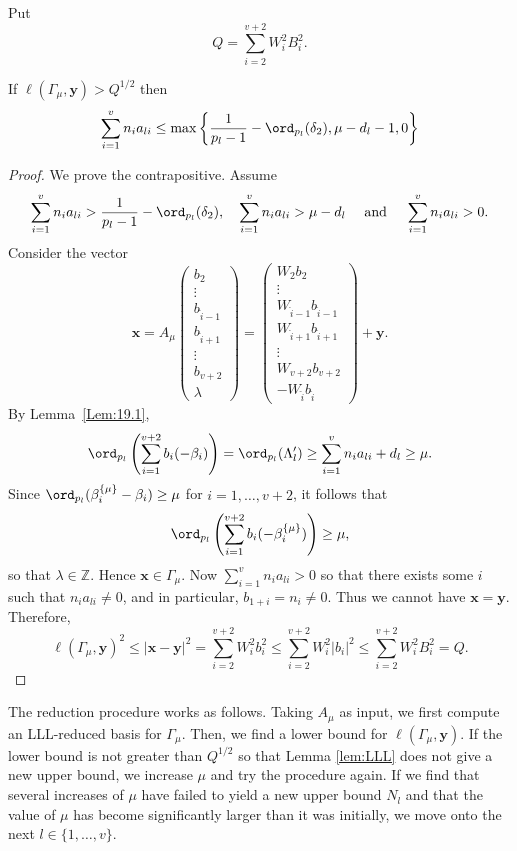 {Put
\[Q = \sum_{i = 2}^{v+2} W_i^2 B_i^2.\]

\begin{lemma} \label{lem:LLL}
If $\ell(\Gamma_{\mu},\mathbf{y}) > Q^{1/2}$ then
\[\sum_{i = 1}^v n_{i}a_{li} \leq \max\left\{ \frac{1}{p_l-1} - \ord_{p_l}(\delta_2), \mu - d_l - 1,0\right\}\]
\end{lemma}

\begin{proof}
We prove the contrapositive. Assume 
\[\sum_{i = 1}^v n_{i}a_{li} > \frac{1}{p_l-1} - \ord_{p_l}(\delta_2), \quad \sum_{i = 1}^v n_{i}a_{li} > \mu - d_l 
\quad \text{ and } \quad \sum_{i = 1}^v n_{i}a_{li} > 0.\]
Consider the vector
\[\mathbf{x} = A_{\mu}
\begin{pmatrix}
b_2\\
\vdots\\
b_{\hat{i}-1}\\
b_{\hat{i}+1}\\
\vdots\\
b_{v+2}\\
\lambda
\end{pmatrix}
= 
\begin{pmatrix}
W_2b_2\\
\vdots\\
W_{\hat{i}-1}b_{\hat{i}-1}\\
W_{\hat{i}+1}b_{\hat{i}+1}\\
\vdots\\
W_{v+2}b_{v+2}\\
-W_{\hat{i}}b_{\hat{i}}
\end{pmatrix}
+ \mathbf{y}.\]
By Lemma~\ref{Lem:19.1},  
\[\ord_{p_l}\left( \sum_{i=1}^{v+2}b_i(-\beta_i)\right) = \ord_{p_l}(\Lambda_l') \geq\sum_{i = 1}^v n_{i}a_{li} + d_l \geq \mu.\]
Since $\ord_{p_l}(\beta_i^{\{\mu\}} - \beta_i) \geq \mu$ for $i = 1, \dots, v+2$, it follows that
\[\ord_{p_l}\left( \sum_{i=1}^{v+2}b_i(-\beta_i^{\{\mu\}})\right) \geq \mu,\]
so that $\lambda \in \mathbb{Z}$. Hence $\mathbf{x} \in \Gamma_{\mu}$. Now $\sum_{i = 1}^v n_{i}a_{li} > 0$ so that there exists some $i$ such that $n_ia_{li} \neq 0$, and in particular, $b_{1+i} = n_i \neq 0$. Thus we cannot have $\mathbf{x} = \mathbf{y}$. Therefore, 
\[\ell(\Gamma_{\mu}, \mathbf{y})^2 \leq |\mathbf{x} - \mathbf{y}|^2 = \sum_{i = 2}^{v+2}W_i^2 b_i^2
\leq  \sum_{i = 2}^{v+2}W_i^2 |b_i|^2 \leq  \sum_{i = 2}^{v+2}W_i^2 B_i^2 = Q.\]
\end{proof}

The reduction procedure works as follows. Taking $A_{\mu}$ as input, we first compute an LLL-reduced basis for $\Gamma_{\mu}$. Then, we find a lower bound for $\ell(\Gamma_{\mu}, \mathbf{y})$. If the lower bound is not greater than $Q^{1/2}$ so that Lemma \ref{lem:LLL} does not give a new upper bound, we increase $\mu$ and try the procedure again. If we find that several increases of $\mu$ have failed to yield a new upper bound $N_l$ and that the value of $\mu$ has become significantly larger than it was initially, we move onto the next $l \in \{1, \dots, v\}$.

}

